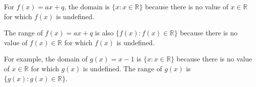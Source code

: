           
          \label{m39338*id238381}For \begin{math}f\left(x\right)=ax+q\end{math}, the domain is \begin{math}\{x:x\in \mathbb{R}\}\end{math} because there is no value of \begin{math}x\in \mathbb{R}\end{math} for which \begin{math}f\left(x\right)\end{math} is undefined.\par 
          \label{m39338*id238474}The range of \begin{math}f\left(x\right)=ax+q\end{math} is also \begin{math}\{f\left(x\right):f\left(x\right)\in \mathbb{R}\}\end{math} because there is no value of \begin{math}f\left(x\right)\in \mathbb{R}\end{math} for which \begin{math}f\left(x\right)\end{math} is undefined.\par 
          \label{m39338*id238584}For example, the domain of \begin{math}g\left(x\right)=x-1\end{math} is \begin{math}\{x:x\in \mathbb{R}\}\end{math} because there is no value of \begin{math}x\in \mathbb{R}\end{math} for which \begin{math}g\left(x\right)\end{math} is undefined. The range of \begin{math}g\left(x\right)\end{math} is \begin{math}\{g\left(x\right):g\left(x\right)\in \mathbb{R}\}\end{math}.\par 
        
        \label{m39338*uid84}
            \nopagebreak
            
